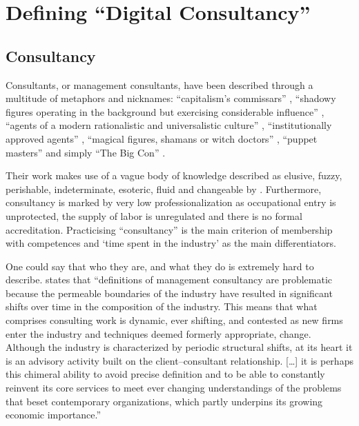 \documentclass[12pt]{article}
\begin{document}
\hypertarget{defining-digital-consultancy}{%
\section{Defining ``Digital
Consultancy''}\label{defining-digital-consultancy}}

\hypertarget{consultancy}{%
\subsection{Consultancy}\label{consultancy}}

Consultants, or management consultants, have been described through a
multitude of metaphors and nicknames: ``capitalism's commissars''
\citep[ 93]{thrift2005}, ``shadowy figures operating in the background
but exercising considerable influence'' \citep[ 31]{kipping2012},
``agents of a modern rationalistic and universalistic culture'' \citep[
190]{kipping2012}, ``institutionally approved agents'' \citep[
193]{kipping2012}, ``magical figures, shamans or witch doctors'' \citep[
68]{fincham2002}, ``puppet masters'' \citep[ 69]{fincham2002} and simply
``The Big Con'' \citep{mazzucato2023}.

Their work makes use of a vague body of knowledge described as elusive,
fuzzy, perishable, indeterminate, esoteric, fluid and changeable by
\citet{muzio2011}. Furthermore, consultancy is marked by very low
professionalization as occupational entry is unprotected, the supply of
labor is unregulated and there is no formal accreditation. \citep[
20]{fincham2006} Practicising ``consultancy'' is the main criterion of
membership with competences and `time spent in the industry' as the main
differentiators.

One could say that who they are, and what they do is extremely hard to
describe. \citet[24]{kipping2012} states that ``definitions of
management consultancy are problematic because the permeable boundaries
of the industry have resulted in significant shifts over time in the
composition of the industry. This means that what comprises consulting
work is dynamic, ever shifting, and contested as new firms enter the
industry and techniques deemed formerly appropriate, change. Although
the industry is characterized by periodic structural shifts, at its
heart it is an advisory activity built on the client--consultant
relationship. {[}\ldots{]} it is perhaps this chimeral ability to avoid
precise definition and to be able to constantly reinvent its core
services to meet ever changing understandings of the problems that beset
contemporary organizations, which partly underpins its growing economic
importance.''
\end{document}
